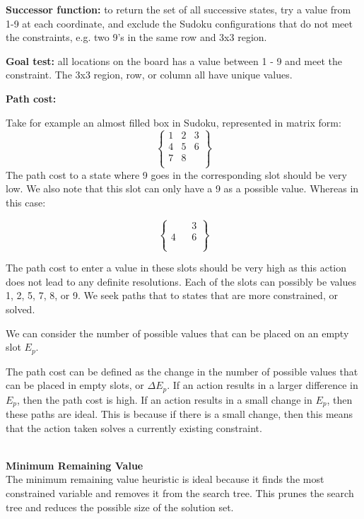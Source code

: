 \textbf{Successor function:} to return the set of all successive states, try a value from 1-9 at each coordinate, and exclude the Sudoku configurations that do not meet the constraints, e.g. two 9's in the same row and 3x3 region.

\textbf{Goal test:} all locations on the board has a value between 1 - 9 and meet the constraint. The 3x3 region, row, or column all have unique values. 

\textbf{Path cost:}

Take for example an almost filled box in Sudoku, represented in matrix form:
\[
\begin{Bmatrix}
	1 & 2 & 3 \\
	4 & 5 & 6 \\
	7 & 8 &  \\	
\end{Bmatrix}
\]
The path cost to a state where 9 goes in the corresponding slot should be very low. We also note that this slot can only have a 9 as a possible value. Whereas in this case:

\[
\begin{Bmatrix}
 &  & 3 \\
4 &  & 6 \\
 &  &  \\	
\end{Bmatrix}
\]

The path cost to enter a value in these slots should be very high as this action does not lead to any definite resolutions. Each of the slots can possibly be values 1, 2, 5, 7, 8, or 9. We seek paths that to states that are more constrained, or solved.

We can consider the number of possible values that can be placed on an empty slot $E_p$.

The path cost can be defined as the change in the number of possible values that can be placed in empty slots, or $\Delta E_p$. If an action results in a larger difference in $E_p$, then the path cost is high. If an action results in a small change in $E_p$, then these paths are ideal. This is because if there is a small change, then this means that the action taken solves a currently existing constraint.

\\
\textbf{Minimum Remaining Value}\\

The minimum remaining value heuristic is ideal because it finds the most constrained variable and removes it from the search tree. This prunes the search tree and reduces the possible size of the solution set.

